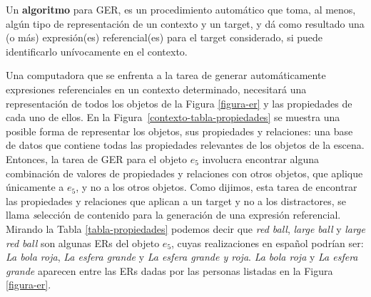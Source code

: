Un {\bf algoritmo} para GER, es un procedimiento autom\'atico que toma, al menos, alg\'un tipo de representaci\'on de un contexto y un target, y d\'a como resultado una (o m\'as) expresi\'on(es) referencial(es) para el target considerado, si puede identificarlo un\'ivocamente en el contexto.

Una computadora que se enfrenta a la tarea de generar autom\'aticamente expresiones referenciales en un contexto determinado, necesitar\'a una representaci\'on de todos los objetos de la Figura \ref{figura-er} y las propiedades de cada uno de ellos. En la Figura~\ref{contexto-tabla-propiedades} se muestra una posible forma de representar los objetos, sus propiedades y relaciones: una base de datos que contiene todas las propiedades relevantes de los objetos de la escena. Entonces, la tarea de GER para el objeto $e_5$ involucra encontrar alguna combinaci\'on de valores de propiedades y relaciones con otros objetos, que aplique \'unicamente a $e_5$, y no a los otros objetos. Como dijimos, esta tarea de encontrar las propiedades y relaciones que aplican a un target y no a los distractores, se llama {\emph selecci\'on de contenido para la generaci\'on de una expresi\'on referencial}. Mirando la Tabla \ref{tabla-propiedades} podemos decir que {\it red ball}, {\it large ball} y {\it large red ball} son algunas ERs del objeto $e_5$, cuyas realizaciones en espa\~{n}ol podr\'ian ser: {\it La bola roja}, {\it La esfera grande} y {\it La esfera grande y roja}. {\it La bola roja} y {\it La esfera grande} aparecen entre las ERs dadas por las personas listadas en la Figura \ref{figura-er}.

